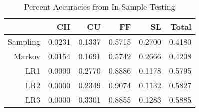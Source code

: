 \begin{table}[ht]
\centering
\begin{tabular}{rrrrrr}
  \hline
 & CH & CU & FF & SL & Total \\ 
  \hline
Sampling & 0.0231 & 0.1337 & 0.5715 & 0.2700 & 0.4180 \\ 
  Markov & 0.0154 & 0.1691 & 0.5742 & 0.2666 & 0.4208 \\ 
  LR1 & 0.0000 & 0.2770 & 0.8886 & 0.1178 & 0.5795 \\ 
  LR2 & 0.0000 & 0.2349 & 0.9074 & 0.1132 & 0.5827 \\ 
  LR3 & 0.0000 & 0.3301 & 0.8855 & 0.1283 & 0.5885 \\ 
   \hline
\end{tabular}
\caption{Percent Accuracies from In-Sample Testing} 
\end{table}

